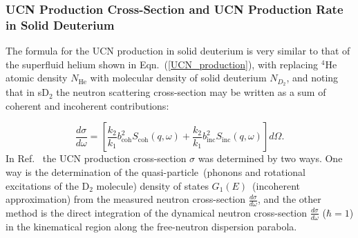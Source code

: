 




\subsubsection{UCN Production Cross-Section and UCN Production Rate in Solid Deuterium~\cite{ucnbook,Frei2010,Frei2009}}

The formula for the UCN production in solid deuterium is very similar
to that of the superfluid helium shown in Eqn.~(\ref{UCN_production}),
with replacing $^4$He atomic density $N_{\text{He}}$ with molecular density
of solid deuterium $N_{D_2}$, and noting that in sD$_2$ the neutron
scattering cross-section may be written as a sum of coherent and
incoherent contributions:

\begin{equation}
\label{eqn:dsigma}
\frac{d\sigma}{d\omega}=\left[ \frac{k_2}{k_1} 
b_{\text{coh}}^2 S_{\text{coh}} (q,\omega) + \frac{k_2}{k_1} b_{\text{inc}}^2 S_{\text{inc}}(q,\omega) \right]
 d\Omega.
\end{equation}
In Ref.~\cite{Frei2010} the UCN production cross-section $\sigma$
was determined by two ways. One way is the determination of the
quasi-particle~(phonons and rotational excitations of the D$_2$
molecule) density of states $G_1(E)$~(incoherent approximation) from
the measured neutron cross-section $\frac{d\sigma}{d\omega}$, and the
other method is the direct integration of the dynamical neutron
cross-section $\frac{d\sigma}{d\omega}$ ($\hbar=1$) in the kinematical
region along the free-neutron dispersion parabola.

